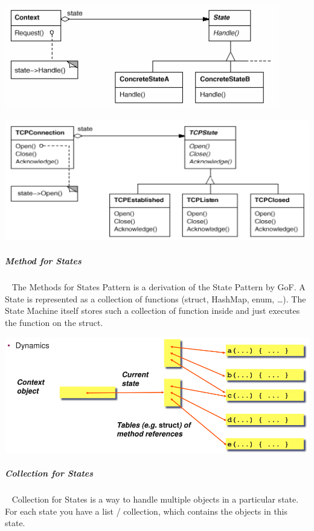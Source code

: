 \documentclass[11pt,twoside,landscape]{article}
\begin{document}
\begin{multicols}{3}
\begin{center}
\includegraphics[width=.9\linewidth]{img/state.png}
\end{center}
\label{fig:state-class-diagram}
\begin{center}
\includegraphics[width=.9\linewidth]{img/state_example.png}
\end{center}
\label{fig:tcp-connection-with-state}

\subparagraph{Method for States} \
\label{sec:org975d21e}
The Methods for States Pattern is a derivation of the State Pattern by GoF.
A State is represented as a collection of functions (struct, HashMap, enum, \ldots{}).
The State Machine itself stores such a collection of function inside and just executes the function on the struct.


{
\begin{center}
\includegraphics[width=.9\linewidth]{img/methods_for_states.png}
\end{center}
\label{NAME: Methods For State Example}
}
\subparagraph{Collection for States} \
\label{sec:orgdbff90c}
Collection for States is a way to handle multiple objects in a particular state.
For each state you have a list / collection, which contains the objects in this state.


\end{multicols}
\end{document}
